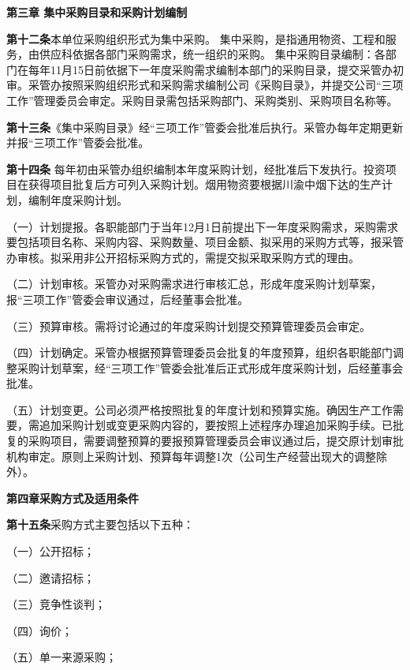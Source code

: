 \begin{center}
\textbf{第三章 \quad  集中采购目录和采购计划编制}
\end{center}

\textbf{第十二条}\quad  本单位采购组织形式为集中采购。
集中采购，是指通用物资、工程和服务，由供应科依据各部门采购需求，统一组织的采购。
集中采购目录编制：各部门在每年11月15日前依据下一年度采购需求编制本部门的采购目录，提交采管办初审。采管办按照采购组织形式和采购需求编制公司《采购目录》，并提交公司“三项工作”管理委员会审定。采购目录需包括采购部门、采购类别、采购项目名称等。

\textbf{第十三条}\quad  《集中采购目录》经“三项工作”管委会批准后执行。采管办每年定期更新并报“三项工作”管委会批准。

\textbf{第十四条} \quad 每年初由采管办组织编制本年度采购计划，经批准后下发执行。投资项目在获得项目批复后方可列入采购计划。烟用物资要根据川渝中烟下达的生产计划，编制年度采购计划。

（一）计划提报。各职能部门于当年12月1日前提出下一年度采购需求，采购需求要包括项目名称、采购内容、采购数量、项目金额、拟采用的采购方式等，报采管办审核。拟采用非公开招标采购方式的，需提交拟采取采购方式的理由。

（二）计划审核。采管办对采购需求进行审核汇总，形成年度采购计划草案，报“三项工作”管委会审议通过，后经董事会批准。

（三）预算审核。需将讨论通过的年度采购计划提交预算管理委员会审定。

（四）计划确定。采管办根据预算管理委员会批复的年度预算，组织各职能部门调整采购计划草案，经“三项工作”管委会批准后正式形成年度采购计划，后经董事会批准。

（五）计划变更。公司必须严格按照批复的年度计划和预算实施。确因生产工作需要，需追加采购计划或变更采购内容的，要按照上述程序办理追加采购手续。已批复的采购项目，需要调整预算的要报预算管理委员会审议通过后，提交原计划审批机构审定。原则上采购计划、预算每年调整1次（公司生产经营出现大的调整除外）。

\begin{center}
\textbf{第四章\quad  采购方式及适用条件}
\end{center}

\textbf{第十五条}\quad  采购方式主要包括以下五种：

    （一）公开招标；

    （二）邀请招标；

    （三）竞争性谈判；

    （四）询价；

（五）单一来源采购；

